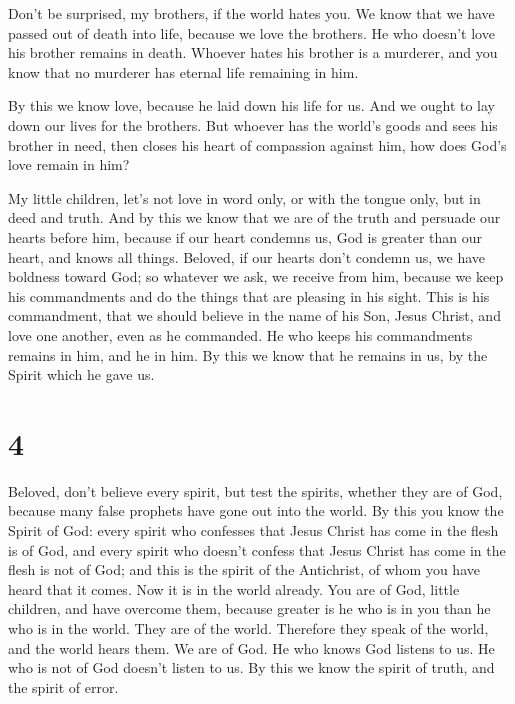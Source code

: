  Don't be surprised, my brothers, if the world hates you.
 We know that we have passed out of death into life,
because we love the brothers. He who doesn't love his brother remains in
death.  Whoever hates his brother is a murderer, and you
know that no murderer has eternal life remaining in him.

 By this we know love, because he laid down his life for
us. And we ought to lay down our lives for the brothers. 
But whoever has the world's goods and sees his brother in need, then
closes his heart of compassion against him, how does God's love remain
in him?

 My little children, let's not love in word only, or with
the tongue only, but in deed and truth.  And by this we
know that we are of the truth and persuade our hearts before him,
 because if our heart condemns us, God is greater than
our heart, and knows all things.  Beloved, if our hearts
don't condemn us, we have boldness toward God;  so
whatever we ask, we receive from him, because we keep his commandments
and do the things that are pleasing in his sight.  This
is his commandment, that we should believe in the name of his Son, Jesus
Christ, and love one another, even as he commanded.  He
who keeps his commandments remains in him, and he in him. By this we
know that he remains in us, by the Spirit which he gave us.

\hypertarget{section-3}{%
\section{4}\label{section-3}}

 Beloved, don't believe every spirit, but test the
spirits, whether they are of God, because many false prophets have gone
out into the world.  By this you know the Spirit of God:
every spirit who confesses that Jesus Christ has come in the flesh is of
God,  and every spirit who doesn't confess that Jesus
Christ has come in the flesh is not of God; and this is the spirit of
the Antichrist, of whom you have heard that it comes. Now it is in the
world already.  You are of God, little children, and have
overcome them, because greater is he who is in you than he who is in the
world.  They are of the world. Therefore they speak of the
world, and the world hears them.  We are of God. He who
knows God listens to us. He who is not of God doesn't listen to us. By
this we know the spirit of truth, and the spirit of error.

